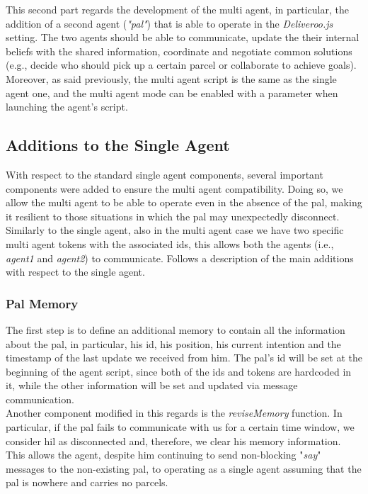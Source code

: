     This second part regards the development of the multi agent, in particular, the addition of a second agent (\textit{"pal"}) that is able to operate in the \textit{Deliveroo.js} setting. The two agents should be able to communicate, update the their internal beliefs with the shared information, coordinate and negotiate common solutions (e.g., decide who should pick up a certain parcel or collaborate to achieve goals).
    \medskip\\    
    Moreover, as said previously, the multi agent script is the same as the single agent one, and the multi agent mode can be enabled with a parameter when launching the agent's script.

    \subsection{Additions to the Single Agent}
        With respect to the standard single agent components, several important components were added to ensure the multi agent compatibility. Doing so, we allow the multi agent to be able to operate even in the absence of the pal, making it resilient to those situations in which the pal may unexpectedly disconnect.
        \medskip\\
        Similarly to the single agent, also in the multi agent case we have two specific multi agent tokens with the associated ids, this allows both the agents (i.e., \textit{agent1} and \textit{agent2}) to communicate. Follows a description of the main additions with respect to the single agent.

        \subsubsection{Pal Memory}
            The first step is to define an additional memory to contain all the information about the pal, in particular, his id, his position, his current intention and the timestamp of the last update we received from him. The pal's id will be set at the beginning of the agent script, since both of the ids and tokens are hardcoded in it, while the other information will be set and updated via message communication.
            \medskip\\
            Another component modified in this regards is the \textit{reviseMemory} function. In particular, if the pal fails to communicate with us for a certain time window, we consider hil as disconnected and, therefore, we clear his memory information. This allows the agent, despite him continuing to send non-blocking "\textit{say}" messages to the non-existing pal, to operating as a single agent assuming that the pal is nowhere and carries no parcels.
            
